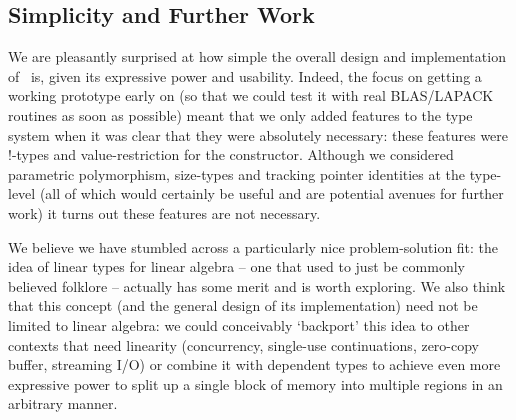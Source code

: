 \subsection{Simplicity and Further Work}

We are pleasantly surprised at how simple the overall design and implementation
of \lang\ is, given its expressive power and usability. Indeed, the focus on
getting a working prototype early on (so that we could test it with real
BLAS/LAPACK routines as soon as possible) meant that we only added features to
the type system when it was clear that they were absolutely necessary: these
features were !-types and value-restriction for the  constructor.
Although we considered parametric polymorphism, size-types and tracking pointer
identities at the type-level\cite{morrisett} (all of which would certainly be
useful and are potential avenues for further work) it turns out these features
are not necessary.

We believe we have stumbled across a particularly nice problem-solution fit:
the idea of linear types for linear algebra -- one that used to just be
commonly believed folklore -- actually has some merit and is worth exploring.
We also think that this concept (and the general design of its implementation)
need not be limited to linear algebra: we could conceivably `backport' this
idea to other contexts that need linearity (concurrency, single-use
continuations, zero-copy buffer, streaming I/O) or combine it with dependent
types to achieve even more expressive power to split up a single block of
memory into multiple regions in an arbitrary manner\cite{space_monads}.
